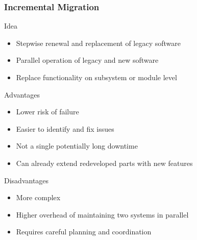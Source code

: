 \begin{frame}
	\frametitle{Incremental Migration}
		\begin{fancycolumns}[widths={50,50}]
			\begin{definition}{Idea}
				\begin{itemize}
					\item Stepwise renewal and replacement of legacy software
					\item Parallel operation of legacy and new software
					\item Replace functionality on subsystem or module level 
				\end{itemize}
			\end{definition}
			\nextcolumn
			\begin{definition}{Advantages}
				\begin{itemize}
					\item Lower risk of failure
					\item Easier to identify and fix issues
					\item Not a single potentially long downtime
					\item Can already extend redeveloped parts with new features
				\end{itemize}
			\end{definition}
			\begin{note}{Disadvantages}
				\begin{itemize}
					\item More complex
					\item Higher overhead of maintaining two systems in parallel
					\item Requires careful planning and coordination
				\end{itemize}
			\end{note}
		\end{fancycolumns}
\end{frame}

